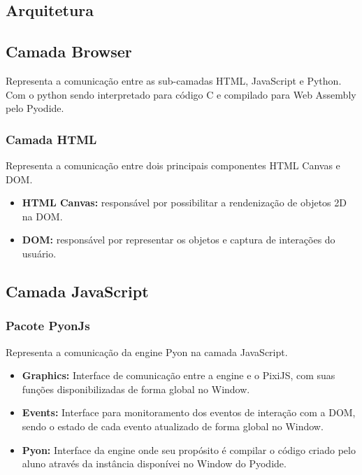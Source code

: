 \begin{apendicesenv}
\section{Arquitetura}

\subsection{Camada Browser}

Representa a comunicação entre as sub-camadas HTML, JavaScript e Python. Com o python sendo interpretado para código C e compilado para Web Assembly pelo Pyodide.

\subsubsection{Camada HTML}

Representa a comunicação entre dois principais componentes HTML Canvas e DOM.

\begin{itemize}
    \item \textbf{HTML Canvas:} responsável por possibilitar a rendenização de objetos 2D na DOM.
    \item \textbf{DOM:} responsável por representar os objetos e captura de interações do usuário.
\end{itemize}

\subsection{Camada JavaScript}

\subsubsection{Pacote PyonJs}

Representa a comunicação da engine Pyon na camada JavaScript.

\begin{itemize}
    \item \textbf{Graphics:} Interface de comunicação entre a engine e o PixiJS, com suas funções disponibilizadas de forma global no Window.
    \item \textbf{Events:} Interface para monitoramento dos eventos de interação com a DOM, sendo o estado de cada evento atualizado de forma global no Window.
    \item \textbf{Pyon:} Interface da engine onde seu propósito é compilar o código criado pelo aluno através da instância disponívei no Window do Pyodide.
\end{itemize}


\end{apendicesenv}
